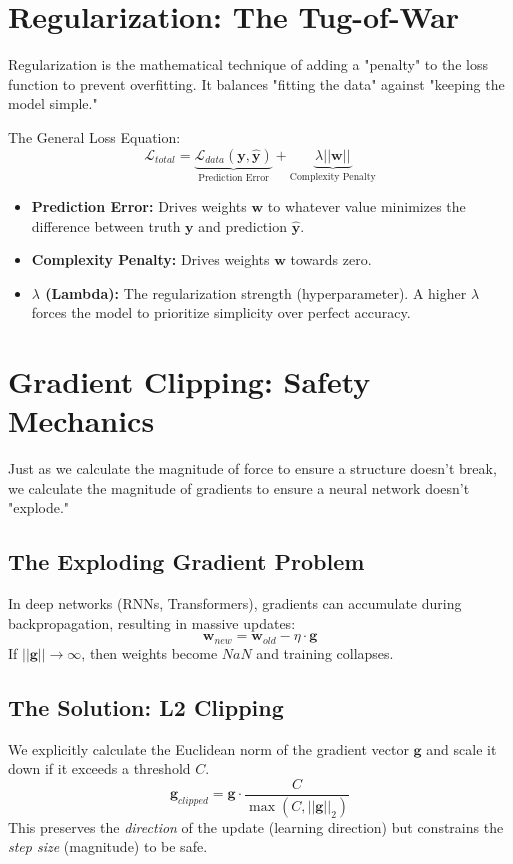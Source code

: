 \documentclass{article}
\begin{document}
\section{Regularization: The Tug-of-War}
Regularization is the mathematical technique of adding a "penalty" to the loss function to prevent overfitting. It balances "fitting the data" against "keeping the model simple."

The General Loss Equation:
$$ \mathcal{L}_{total} = \underbrace{\mathcal{L}_{data}(\mathbf{y}, \hat{\mathbf{y}})}_{\text{Prediction Error}} + \underbrace{\lambda ||\mathbf{w}||}_{\text{Complexity Penalty}} $$

\begin{itemize}
    \item \textbf{Prediction Error:} Drives weights $\mathbf{w}$ to whatever value minimizes the difference between truth $\mathbf{y}$ and prediction $\hat{\mathbf{y}}$.
    \item \textbf{Complexity Penalty:} Drives weights $\mathbf{w}$ towards zero.
    \item \textbf{$\lambda$ (Lambda):} The regularization strength (hyperparameter). A higher $\lambda$ forces the model to prioritize simplicity over perfect accuracy.
\end{itemize}

\section{Gradient Clipping: Safety Mechanics}
Just as we calculate the magnitude of force to ensure a structure doesn't break, we calculate the magnitude of gradients to ensure a neural network doesn't "explode."

\subsection{The Exploding Gradient Problem}
In deep networks (RNNs, Transformers), gradients can accumulate during backpropagation, resulting in massive updates:
$$ \mathbf{w}_{new} = \mathbf{w}_{old} - \eta \cdot \mathbf{g} $$
If $||\mathbf{g}|| \to \infty$, then weights become $NaN$ and training collapses.

\subsection{The Solution: L2 Clipping}
We explicitly calculate the Euclidean norm of the gradient vector $\mathbf{g}$ and scale it down if it exceeds a threshold $C$.
$$ \mathbf{g}_{clipped} = \mathbf{g} \cdot \frac{C}{\max(C, ||\mathbf{g}||_2)} $$
This preserves the \textit{direction} of the update (learning direction) but constrains the \textit{step size} (magnitude) to be safe.
\end{document}
